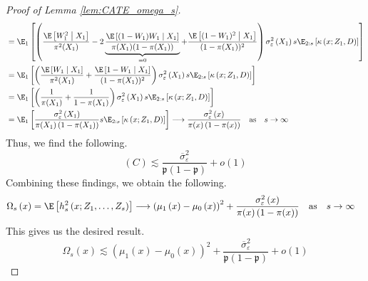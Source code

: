 \begin{proof}[Proof of Lemma \ref{lem:CATE_omega_s}]
\begin{equation}
\begin{aligned}
            & = \E_{1}\left[\left(\frac{\E\left[W_{1}^2 \; \middle| \; X_1\right]}{\pi^2(X_1)} 
            - 2 \underbrace{\frac{\E\left[(1 - W_{1})W_{1}\; \middle| \; X_1\right]}{\pi(X_1)(1 - \pi(X_1))}}_{ = 0} 
            + \frac{\E\left[(1 - W_{1})^2\; \middle| \; X_1\right]}{(1 - \pi(X_1))^2}\right)
             \sigma_{\varepsilon}^2\left(X_1\right) s \E_{2:s}\left[\kappa\left(x; Z_1, D\right)\right]\right] \\ 
            & = \E_{1}\left[\left(\frac{\E\left[W_{1} \; \middle| \; X_1\right]}{\pi^2(X_1)} 
            + \frac{\E\left[1 - W_{1}\; \middle| \; X_1\right]}{(1 - \pi(X_1))^2}\right)
             \sigma_{\varepsilon}^2\left(X_1\right) s \E_{2:s}\left[\kappa\left(x; Z_1, D\right)\right]\right] \\
            & = \E_{1}\left[\left(\frac{1}{\pi(X_1)} + \frac{1}{1 - \pi(X_1)}\right)
             \sigma_{\varepsilon}^2\left(X_1\right) s \E_{2:s}\left[\kappa\left(x; Z_1, D\right)\right]\right] \\
            & = \E_{1}\left[\frac{\sigma_{\varepsilon}^2\left(X_1\right)}{\pi(X_1)\left(1 - \pi(X_1)\right)} s \E_{2:s}\left[\kappa\left(x; Z_1, D\right)\right]\right]
            \longrightarrow \frac{\sigma_{\varepsilon}^2\left(x\right)}{\pi(x)\left(1 - \pi(x)\right)}
            \quad \text{as} \quad
            s \rightarrow \infty
        \end{aligned}
    \end{equation}
    Thus, we find the following.
    \begin{equation}
        (C) \lesssim \frac{\overline{\sigma}^2_{\varepsilon}}{\mathfrak{p}\left(1 - \mathfrak{p}\right)} + o(1)
    \end{equation}
    Combining these findings, we obtain the following.
    \begin{equation}
        \begin{aligned}
            \Omega_{s}\left(x\right)
            & = \E\left[h_{s}^{2}\left(x; Z_1, \ldots,  Z_{s}\right)\right]
            \longrightarrow \left(\mu_{1}\left(x\right) - \mu_{0}\left(x\right)\right)^2 + \frac{\sigma_{\varepsilon}^2\left(x\right)}{\pi(x)\left(1 - \pi(x)\right)}
            \quad \text{as} \quad
            s \rightarrow \infty
        \end{aligned}
    \end{equation}
    This gives us the desired result.
    \begin{equation}
        \Omega_{s}\left(x\right)
        \lesssim \left(\mu_{1}\left(x\right) - \mu_{0}\left(x\right)\right)^2 + \frac{\overline{\sigma}^2_{\varepsilon}}{\mathfrak{p}\left(1 - \mathfrak{p}\right)} + o(1)
    \end{equation}
\end{proof}


